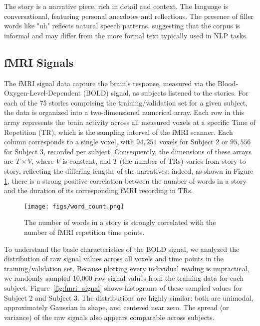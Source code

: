 \documentclass[10pt,letterpaper]{article}
\begin{document}
The story is a narrative piece, rich in detail and context. The language is conversational, featuring personal anecdotes and reflections. The presence of filler words like "uh" reflects natural speech patterns, suggesting that the corpus is informal and may differ from the more formal text typically used in NLP tasks.


\subsection{fMRI Signals}
The fMRI signal data capture the brain's response, measured via the Blood-Oxygen-Level-Dependent (BOLD) signal, as subjects listened to the stories. For each of the 75 stories comprising the training/validation set for a given subject, the data is organized into a two-dimensional numerical array. Each row in this array represents the brain activity across all measured voxels at a specific Time of Repetition (TR), which is the sampling interval of the fMRI scanner. Each column corresponds to a single voxel, with $94,251$ voxels for Subject 2 or $95,556$ for Subject 3, recorded per subject. Consequently, the dimensions of these arrays are \(T \times V\), where \(V\) is constant, and \(T\) (the number of TRs) varies from story to story, reflecting the differing lengths of the narratives; indeed, as shown in Figure \ref{fig:word_count}, there is a strong positive correlation between the number of words in a story and the duration of its corresponding fMRI recording in TRs.

\begin{figure}[ht]
    \centering
    \texttt{[image: figs/word\_count.png]}
    \caption{The number of words in a story is strongly correlated with the number of fMRI repetition time points.}
    \label{fig:word_count}
\end{figure}

To understand the basic characteristics of the BOLD signal, we analyzed the distribution of raw signal values across all voxels and time points in the training/validation set. Because plotting every individual reading is impractical, we randomly sampled 10,000 raw signal values from the training data for each subject. Figure~\ref{fig:fmri_signal} shows histograms of these sampled values for Subject 2 and Subject 3. The distributions are highly similar: both are unimodal, approximately Gaussian in shape, and centered near zero. The spread (or variance) of the raw signals also appears comparable across subjects.
\end{document}
